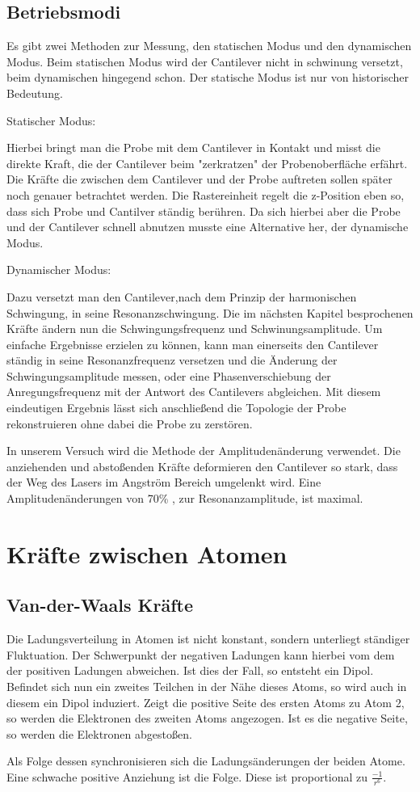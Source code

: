 \subsection{Betriebsmodi}

Es gibt zwei Methoden zur Messung, den statischen Modus und den dynamischen Modus. Beim statischen Modus wird der Cantilever nicht in schwinung versetzt, beim dynamischen hingegend schon. Der statische Modus ist nur von historischer Bedeutung.
\par
Statischer Modus:
\par
Hierbei bringt man die Probe mit dem Cantilever in Kontakt und misst die direkte Kraft, die der Cantilever beim "zerkratzen" der Probenoberfläche erfährt. 
Die Kräfte die zwischen dem Cantilever und der Probe auftreten sollen später noch genauer betrachtet werden.
Die Rastereinheit regelt die z-Position eben so, dass sich Probe und Cantilver ständig berühren.
Da sich hierbei aber die Probe und der Cantilever schnell abnutzen musste eine Alternative her, der dynamische Modus.
\par
Dynamischer Modus:
\par
Dazu versetzt man den Cantilever,nach dem Prinzip der harmonischen Schwingung, in seine Resonanzschwingung.
Die im nächsten Kapitel besprochenen Kräfte ändern nun die Schwingungsfrequenz und Schwinungsamplitude.
Um einfache Ergebnisse erzielen zu können, kann man einerseits den Cantilever ständig in seine Resonanzfrequenz versetzen und die Änderung der Schwingungsamplitude messen, oder eine Phasenverschiebung der Anregungsfrequenz mit der Antwort des Cantilevers abgleichen.
Mit diesem eindeutigen Ergebnis lässt sich anschließend die Topologie der Probe rekonstruieren ohne dabei die Probe zu zerstören.
\par
In unserem Versuch wird die Methode der Amplitudenänderung verwendet. 
Die anziehenden und abstoßenden Kräfte deformieren den Cantilever so stark, dass der Weg des Lasers im Angström Bereich umgelenkt wird. 
Eine Amplitudenänderungen von 70\% , zur Resonanzamplitude, ist maximal. 


    \section{Kräfte zwischen Atomen}
        \subsection{Van-der-Waals Kräfte}

Die Ladungsverteilung in Atomen ist nicht konstant, sondern unterliegt ständiger 
Fluktuation. Der Schwerpunkt der negativen Ladungen kann hierbei vom dem der
positiven Ladungen abweichen. Ist dies der Fall, so entsteht ein Dipol. 
Befindet sich nun ein zweites Teilchen in der Nähe dieses Atoms, so wird auch
in diesem ein Dipol induziert. Zeigt die positive Seite des ersten Atoms zu Atom 2,
so werden die Elektronen des zweiten Atoms angezogen. Ist es die negative Seite, so
werden die Elektronen abgestoßen. \par
Als Folge dessen synchronisieren sich die Ladungsänderungen der beiden Atome. Eine
schwache positive Anziehung ist die Folge. Diese ist proportional zu $\displaystyle
\frac{-1}{r^6}$.

